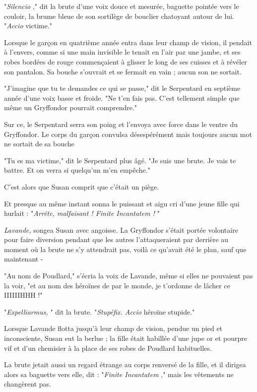 "\emph{Silencio} ," dit la brute d'une voix douce et mesurée, baguette pointée vers le couloir, la brume bleue de son sortilège de bouclier chatoyant autour de lui. "\emph{Accio}  victime."

Lorsque le garçon en quatrième année entra dans leur champ de vision, il pendait à l'envers, comme si une main invisible le tenait en l'air par une jambe, et ses robes bordées de rouge commençaient à glisser le long de ses cuisses et à révéler son pantalon. Sa bouche s'ouvrait et se fermait en vain ; aucun son ne sortait.

"J'imagine que tu te demandes ce qui se passe," dit le Serpentard en septième année d'une voix basse et froide. "Ne t'en fais pas. C'est tellement simple que même un Gryffondor pourrait comprendre."

Sur ce, le Serpentard serra son poing et l'envoya avec force dans le ventre du Gryffondor. Le corps du garçon convulsa désespérément mais toujours aucun mot ne sortait de sa bouche

"Tu es ma victime," dit le Serpentard plus âgé. "Je suis une brute. Je vais te battre. Et on verra si quelqu'un m'en empêche."

C'est alors que Susan comprit que c'était un piège.

Et presque au même instant sonna le puissant et aigu cri d'une jeune fille qui hurlait : "\emph{Arrête, malfaisant ! Finite Incantatem !} "

\emph{Lavande,}  songea Susan avec angoisse. La Gryffondor s'était portée volontaire pour faire diversion pendant que les autres l'attaqueraient par derrière au moment où la brute ne s'y attendrait pas, voilà ce qu'avait été le plan, sauf que maintenant -

"Au nom de Poudlard," s'écria la voix de Lavande, même si elles ne pouvaient pas la voir, "et au nom des héroïnes de par le monde, je t'ordonne de lâcher ce IIIIIIHHH !"

"\emph{Expelliarmus,} " dit la brute. "\emph{Stupéfix. Accio } héroïne stupide."

Lorsque Lavande flotta jusqu'à leur champ de vision, pendue un pied et inconsciente, Susan eut la berlue ; la fille était habillée d'une jupe or et pourpre vif et d'un chemisier à la place de ses robes de Poudlard habituelles.

La brute jetait aussi un regard étrange au corps renversé de la fille, et il dirigea alors sa baguette vers elle, dit : "\emph{Finite Incantatem} ," mais les vêtements ne changèrent pas.

